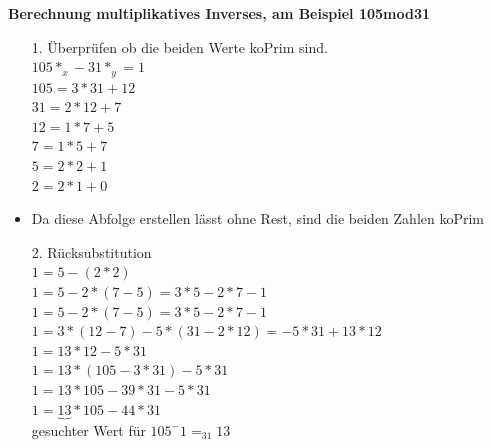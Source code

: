 \documentclass[a4paper,10pt]{article}
\newcommand{\Bold}[1]{\textbf{#1}} %
\begin{document}
\Bold {Berechnung multiplikatives Inverses, am Beispiel 105mod31}
\begin{itemize}
	\item [1. ] \"Uberprüfen ob die beiden Werte koPrim sind.\\
		$105 * _x  - 31 * _y = 1$ \\
		$105 = 3 * 31 + 12$ \\
		$31  = 2 * 12 + 7$ \\
		$12  = 1 *  7 + 5$ \\
		$ 7  = 1 *  5 + 7$ \\
		$ 5  = 2 *  2 + 1$ \\
		$ 2  = 2 *  1 + 0$ \\
	\item Da diese Abfolge erstellen l\"asst ohne Rest, sind die beiden Zahlen koPrim
	\item [2. ] R\"ucksubstitution\\
		$1  = 5 - (2 * 2)$ \\
		$1  = 5 - 2*(7 - 5) = 3 * 5 - 2 * 7 - 1$ \\
		$1  = 5 - 2*(7 - 5) = 3 * 5 - 2 * 7 - 1$ \\
		$1  = 3*(12 - 7) - 5* (31 - 2*12) = -5*31 + 13 *12$ \\
		$1  = 13 *12 - 5 * 31$ \\
		$1  = 13* (105- 3*31)- 5 * 31$ \\
		$1  = 13* 105 - 39 * 31 - 5* 31 $ \\
		$1  = \underbrace{13} * 105- 44*31$ \\
		gesuchter Wert f\"ur $105^-1 =_{31}13$
\end{itemize}
\end{document}
